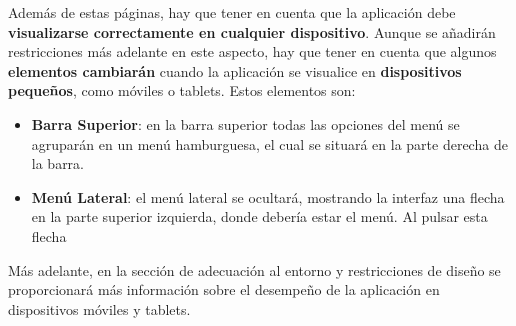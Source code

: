 \begin{appendices}
Además de estas páginas, hay que tener en cuenta que la aplicación debe \textbf{visualizarse correctamente en cualquier dispositivo}. Aunque se añadirán restricciones más adelante en este aspecto, hay que tener en cuenta que algunos \textbf{elementos cambiarán} cuando la aplicación se visualice en \textbf{dispositivos pequeños}, como móviles o tablets. Estos elementos son:

\begin{itemize}
	\item \textbf{Barra Superior}: en la barra superior todas las opciones del menú se agruparán en un \gls{menú hamburguesa}, el cual se situará en la parte derecha de la barra.
	
	\item \textbf{Menú Lateral}: el menú lateral se ocultará, mostrando la interfaz una flecha en la parte superior izquierda, donde debería estar el menú. Al pulsar esta flecha 
\end{itemize}

Más adelante, en la sección de adecuación al entorno y restricciones de diseño se proporcionará más información sobre el desempeño de la aplicación en dispositivos móviles y tablets.


\end{appendices}

\newpage

\printglossary	

\newpage




